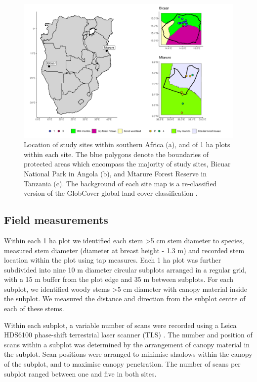 \documentclass[11pt,a4paper]{article}
\begin{document}
\begin{figure}[H]
\centering
	\includegraphics[width=\textwidth]{map}
	\caption{Location of study sites within southern Africa (a), and of 1 ha plots within each site. The blue polygons denote the boundaries of protected areas which encompass the majority of study sites, Bicuar National Park in Angola (b), and Mtarure Forest Reserve in Tanzania (c). The background of each site map is a re-classified version of the GlobCover global land cover classification \citep{Globcover}.}
	\label{map}
\end{figure}

\subsection{Field measurements}

Within each 1 ha plot we identified each stem >5 cm stem diameter to species, measured stem diameter (diameter at breast height - 1.3 m) and recorded stem location within the plot using tap measures. Each 1 ha plot was further subdivided into nine 10 m diameter circular subplots arranged in a regular grid, with a 15 m buffer from the plot edge and 35 m between subplots. For each subplot, we identified woody stems >5 cm diameter with canopy material inside the subplot. We measured the distance and direction from the subplot centre of each of these stems.

Within each subplot, a variable number of scans were recorded using a Leica HDS6100 phase-shift terrestrial laser scanner (TLS) \citep{Leica}. The number and position of scans within a subplot was determined by the arrangement of canopy material in the subplot. Scan positions were arranged to minimise shadows within the canopy of the subplot, and to maximise canopy penetration. The number of scans per subplot ranged between one and five in both sites. 
\end{document}
